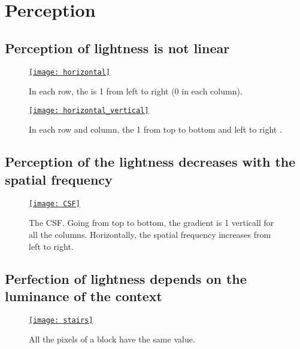 \chapter{Perception}

\section{Perception of lightness \cite{wikipedia_lightness} is not linear}
\begin{figure}[H]
  \centering
  \href{https://github.com/vicente-gonzalez-ruiz/medical_imaging/blob/main/notebooks/horizontal_vertical.ipynb}{\texttt{[image: horizontal]}}
  \caption[Perception of lightness (brightness) is not linear (1).]{In each row, the  is 1 from left to right (0 in each column).}
  \label{fig:HVS_no_linear}
\end{figure}

\begin{figure}[H]
  \centering
  \href{https://github.com/vicente-gonzalez-ruiz/medical_imaging/blob/main/notebooks/horizontal_vertical.ipynb}{\texttt{[image: horizontal\_vertical]}}
  \caption[Perception of lightness is not linear (2).]{In each row and column, the  1 from top to bottom and left to right .}
  \label{fig:HVS_no_linear}
\end{figure}

\section{Perception of the lightness decreases with the spatial frequency}
\begin{figure}[H]
  \centering
  \href{https://github.com/vicente-gonzalez-ruiz/medical_imaging/blob/main/notebooks/CSF.ipynb}{\texttt{[image: CSF]}}
  \caption[Lightness VS spatial frequency (the \gls{CSF}).]{The
    \gls{CSF}. Going from top to bottom, the gradient is 1 verticall
    for all the columns. Horizontally, the spatial frequency increases
    from left to right.}
  \label{fig:CSF}
\end{figure}

\section{Perfection of lightness depends on the luminance of the context}
\begin{figure}[H]
  \centering
  \href{https://github.com/vicente-gonzalez-ruiz/medical_imaging/blob/main/notebooks/stairs.ipynb}{\texttt{[image: stairs]}}
  \caption[Lightness VS surrounding luminance (1).]{All the pixels of a block have the same value.}
  \label{fig:stairs}
\end{figure}

